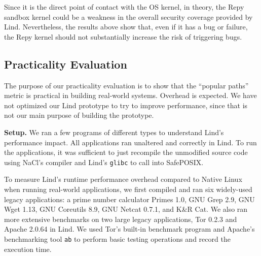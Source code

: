 {{{Since it is the direct point of contact with the OS kernel, in theory, the Repy
 sandbox kernel could be a weakness in the overall security coverage provided by Lind.
Nevertheless, the results above show that, even if it has a
bug or failure, the Repy kernel should not substantially increase the risk of triggering bugs.

\subsection{Practicality Evaluation}
\label{Performance-Evaluation}

The purpose of our practicality evaluation is to show that the 
``popular paths'' metric is practical in building real-world systems. Overhead is expected. 
We have not optimized our Lind prototype to try to improve performance, since that is not 
our main purpose of building the prototype. 


\noindent
\textbf{Setup.}
We ran a few programs of different types to understand Lind's performance
impact.  All applications ran unaltered and correctly in Lind. To run the
applications, it was sufficient to just recompile the unmodified
source code using NaCl's compiler and Lind's \texttt{glibc} to call
into SafePOSIX.

To measure Lind's runtime performance overhead compared to Native Linux
 when running real-world applications,
we first compiled and ran six widely-used legacy applications:
a prime number calculator Primes 1.0,
GNU Grep 2.9, GNU Wget 1.13, GNU Coreutils 8.9,
GNU Netcat 0.7.1, and K\&R Cat.
We also ran more extensive benchmarks on two large legacy applications,
Tor 0.2.3 and Apache 2.0.64 in Lind.
We used Tor's built-in benchmark program and Apache's benchmarking tool
\texttt{ab} to perform basic testing operations and record the execution time.

}}}
